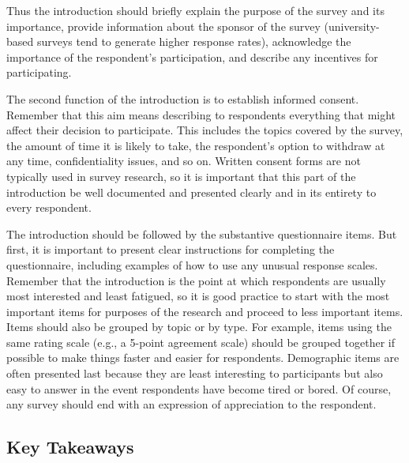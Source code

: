 Thus the introduction should briefly explain the purpose of the survey and its importance, provide information about the sponsor of the survey (university-based surveys tend to generate higher response rates), acknowledge the importance of the respondent’s participation, and describe any incentives for participating.

The second function of the introduction is to establish informed consent. Remember that this aim means describing to respondents everything that might affect their decision to participate. This includes the topics covered by the survey, the amount of time it is likely to take, the respondent’s option to withdraw at any time, confidentiality issues, and so on. Written consent forms are not typically used in survey research, so it is important that this part of the introduction be well documented and presented clearly and in its entirety to every respondent.

The introduction should be followed by the substantive questionnaire items. But first, it is important to present clear instructions for completing the questionnaire, including examples of how to use any unusual response scales. Remember that the introduction is the point at which respondents are usually most interested and least fatigued, so it is good practice to start with the most important items for purposes of the research and proceed to less important items. Items should also be grouped by topic or by type. For example, items using the same rating scale (e.g., a 5-point agreement scale) should be grouped together if possible to make things faster and easier for respondents. Demographic items are often presented last because they are least interesting to participants but also easy to answer in the event respondents have become tired or bored. Of course, any survey should end with an expression of appreciation to the respondent.


\subsection{Key Takeaways}

